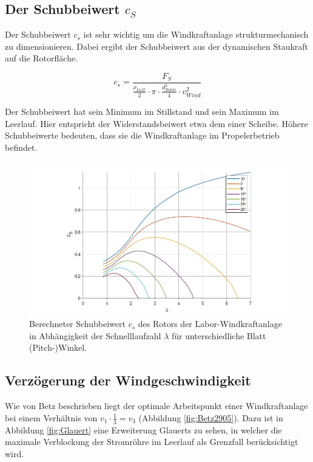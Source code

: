 \subsection{Der Schubbeiwert \texorpdfstring{$c_S$}{}}

Der Schubbeiwert $c_{s}$ ist sehr wichtig um die Windkraftanlage strukturmechanisch zu dimensionieren.  Dabei ergibt der Schubbeiwert aus der dynamischen Staukraft auf die Rotorfläche.

\begin{equation}
  c_{s}= \frac{F_{S}}{\frac{\rho_{Luft}}{2}\cdot \pi \cdot \frac{d^2_{Rotor}}{4} \cdot v^2_{Wind}}
    \label{eq:Schubbeiwert_cs}
\end{equation}

Der Schubbeiwert hat sein Minimum im Stillstand und sein Maximum im Leerlauf. Hier entspricht der Widerstandsbeiwert etwa dem einer Scheibe. Höhere Schubbeiwerte bedeuten, dass sie die Windkraftanlage im Propelerbetrieb befindet.\cite{Anleitung}

\begin{figure}[H]
    \centering
    \includegraphics[width=1\textwidth]{Abbildungen/cszulambda.jpg}
    \caption{Berechneter Schubbeiwert $c_{s}$ des Rotors der Labor-Windkraftanlage in Abhängigkeit der Schnelllaufzahl $\lambda$ für unterschiedliche Blatt (Pitch-)Winkel.\cite{Anleitung}}
    \label{fig:cszulambda}
  \end{figure}

\newpage
\subsection{Verzögerung der Windgeschwindigkeit}
Wie von Betz beschrieben liegt der optimale Arbeitspunkt einer Windkraftanlage bei einem Verhältnis von $v_{1} \cdot \frac{1}{3}=v_{3}$  (Abbildung \ref{fig:Betz2905}). Dazu ist in Abbildung \ref{fig:Glauert} eine Erweiterung Glauerts zu sehen, in welcher die maximale Verblockung der Stromröhre im Leerlauf als Grenzfall berücksichtigt wird.

